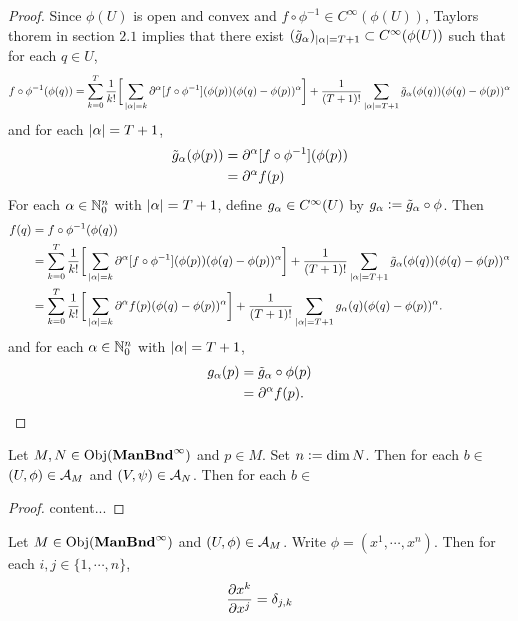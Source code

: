 \documentclass{book}
\begin{document}
\begin{proof}
	Since $\phi(U)$ is open and convex and $f \circ \phi^{-1} \in C^{\infty}(\phi(U))$, Taylors thorem in section $2.1$ implies that there exist $(\tilde{g}_{\alpha})_{|\alpha| = T+1} \subset C^{\infty}(\phi(U))$ such that for each $q \in U$, 
	$$f \circ \phi^{-1} (\phi(q)) = \sum_{k=0}^{T} \frac{1}{k!} \bigg[\sum_{|\alpha| = k}\partial^{\alpha} [f \circ \phi^{-1}] (\phi(p)) (\phi(q) - \phi(p))^{\alpha}  \bigg] + \frac{1}{(T+1)!}\sum_{|\alpha| = T+1} \tilde{g}_{\alpha}(\phi(q)) (\phi(q) - \phi(p))^{\alpha}  $$	
	and for each $|\alpha|= T+1$, 
	\begin{align*}
		\tilde{g}_{\alpha}(\phi(p)) 
		& = \partial^{\alpha} [f \circ \phi^{-1}](\phi(p)) \\
		& = \partial^{\alpha} f (p)
	\end{align*}
	For each $\alpha \in \mathbb{N}_0^n$ with $|\alpha| = T+1$, define $g_{\alpha} \in C^{\infty}(U)$ by $g_{\alpha} \vcentcolon= \tilde{g}_{\alpha} \circ \phi$. Then 
	\begin{align*}
		f(q) 
		& = f \circ \phi^{-1} (\phi(q)) \\
		& = \sum_{k=0}^{T} \frac{1}{k!} \bigg[\sum_{|\alpha| = k} \partial^{\alpha} [f \circ \phi^{-1}] (\phi(p)) (\phi(q) - \phi(p))^{\alpha}  \bigg] + \frac{1}{(T+1)!} \sum_{|\alpha| = T+1} \tilde{g}_{\alpha}(\phi(q)) (\phi(q) - \phi(p))^{\alpha} \\
		& = \sum_{k=0}^{T} \frac{1}{k!} \bigg[\sum_{|\alpha| = k} \partial^{\alpha} f(p) (\phi(q) - \phi(p))^{\alpha} \bigg] + \frac{1}{(T+1)!} \sum_{|\alpha| = T+1} g_{\alpha}(q) (\phi(q) - \phi(p))^{\alpha}.
	\end{align*}			
	and for each $\alpha \in \mathbb{N}_0^n$ with $|\alpha| = T+1$, 
	\begin{align*}
		g_{\alpha}(p) 
		 & = \tilde{g}_{\alpha} \circ \phi(p) \\
		 & = \partial^{\alpha} f(p).
	\end{align*}
\end{proof}

\begin{ex} 
	Let $M, N \in \operatorname{Obj}(\operatorname*{\text{\textbf{ManBnd}}^{\infty}})$ and $p \in M$. Set $n \vcentcolon= \dim N$. Then for each $b \in $ $(U, \phi) \in \mathcal{A}_M$ and $(V, \psi) \in \mathcal{A}_N$. Then for each $b \in $  
\end{ex}

\begin{proof}
	content...
\end{proof}


\begin{ex} 
	Let $M \in \operatorname{Obj}(\operatorname*{\text{\textbf{ManBnd}}^{\infty}})$ and $(U, \phi) \in \mathcal{A}_M$. Write $\phi = (x^1, \cdots, x^n)$. Then for each $i,j \in \{1, \cdots, n\}$,  
	$$\frac{\partial x^k}{\partial x^j} = \delta_{j,k}$$
\end{ex}
\end{document}
